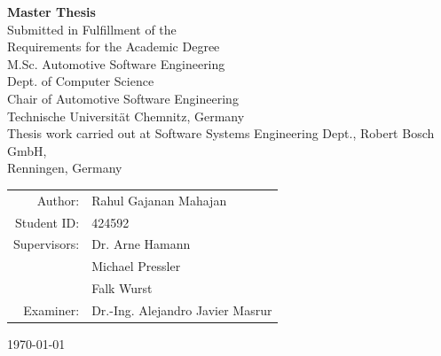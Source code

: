 \documentclass[a4paper, 12pt, oneside, BCOR1cm,toc=chapterentrywithdots]{scrbook}
\newcommand\blankpage{%
    \null
    \thispagestyle{empty}%
    \addtocounter{page}{-1}%
    \newpage}
\begin{document}
\begin{titlepage}
\begin{center}
\Large{\textbf{Master Thesis}}\\ 
\vspace{0.8cm}
Submitted in Fulfillment of the\\
Requirements for the Academic Degree\\
M.Sc. Automotive Software Engineering\\
\vspace{0.5cm}
Dept. of Computer Science\\
Chair of Automotive Software Engineering\\
Technische Universit{\"a}t Chemnitz, Germany\\
\vspace{0.5cm}
Thesis work carried out at Software Systems Engineering Dept., Robert Bosch GmbH, \\
Renningen, Germany

\vspace{0.8cm}
	\begin{tabular}{@{}>{}rl@{}}
			Author:	& Rahul Gajanan Mahajan \\
    		Student ID:	& 424592               \\
    		Supervisors:	& Dr. Arne Hamann \\
    						& Michael Pressler \\
    						& Falk Wurst \\
    		Examiner:	& Dr.-Ing. Alejandro Javier Masrur\\
    					
  	\end{tabular}

\vspace{0.5cm}  	
\today\\  	

\end{center}
\end{titlepage}

\afterpage{\blankpage}




\end{document}
